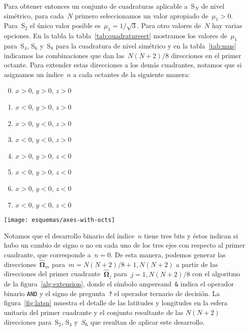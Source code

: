 \medskip

Para obtener entonces un conjunto de cuadraturas aplicable a~S$_N$ de nivel simétrico, para cada~$N$ primero seleccionamos un valor apropiado de~$\mu_1 > 0$. Para~S$_2$ el único valor posible es~$\mu_1=1/\sqrt{3}$. Para otro valores de~$N$ hay varias opciones. En la tabla la tabla~\ref{tab:quadratureset} mostramos los valores de~$\mu_1$ para~S$_4$, S$_6$ y~S$_8$ para la cuadratura de nivel simétrico y en la tabla~\ref{tab:mus} indicamos las combinaciones que dan las~$N(N+2)/8$ direcciones en el primer octante. Para extender estas direcciones a los demás cuadrantes, notamos que si asignamos un índice~$n$ a cada octantes de la siguiente manera:

\medskip

\begin{minipage}{0.35\linewidth}
\begin{enumerate}
\setcounter{enumi}{-1}
 \item $x>0$, $y>0$, $z>0$
 \item $x<0$, $y>0$, $z>0$
 \item $x>0$, $y<0$, $z>0$
 \item $x<0$, $y<0$, $z>0$
 \item $x>0$, $y>0$, $z<0$
 \item $x<0$, $y>0$, $z<0$
 \item $x>0$, $y<0$, $z<0$
 \item $x<0$, $y<0$, $z<0$
\end{enumerate}
\end{minipage}
\begin{minipage}{0.6\linewidth}
 \begin{center}
  \texttt{[image: esquemas/axes-with-octs]}
 \end{center}
\end{minipage}

Notamos que el desarrollo binario del índice~$n$ tiene tres bits y éstos indican si hubo un cambio de signo o no en cada uno de los tres ejes con respecto al primer cuadrante, que corresponde a~$n=0$. De esta manera, podemos generar las direcciones~$\boldsymbol{\hat{\Omega}}_m$ para~$m=N(N+2)/8+1, N(N+2)$ a partir de las direcciones del primer cuadrante~$\boldsymbol{\hat{\Omega}}_j$ para~$j=1,N(N+2)/8$ con el algoritmo de la figura~\ref{alg:extension}, donde el símbolo ampersand~\texttt{\&} indica el operador binario \texttt{AND} y el signo de pregunta~\texttt{?} el operador ternario de decisión. La figura~\ref{fig:latsn} muestra el detalle de las latitudes y longitudes en la esfera unitaria del primer cuadrante y el conjunto resultante de las $N(N+2)$ direcciones para~S$_2$, S$_4$ y~$S_6$ que resultan de aplicar este desarrollo.

